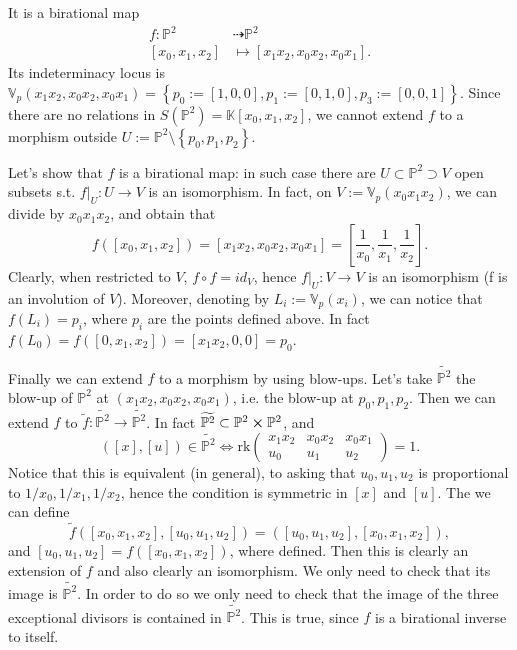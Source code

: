 \begin{ex}
	It is a birational map
	\begin{align}
		f: \mathbb{P}^{2} &\dashrightarrow \mathbb{P}^{2} \\
		\left[ x_0, x_1 , x_2 \right] &\mapsto [ x_1x_2, x_0x_2, x_0x_1]
	.\end{align} 
	Its indeterminacy locus is $\mathbb{V}_p\left( x_1x_2, x_0x_2, x_0x_1 \right) = \left\{ 
	p_0 := [1,0,0], p_1 := [0,1,0], p_3 := [0,0,1] \right\}$.
	Since there are no relations in $S(\mathbb{P}^{2}) = \mathbb{K}\left[x_0, x_1, x_2 \right]$,
	we cannot extend $f$ to a morphism outside $U:= \mathbb{P}^{2} \setminus \left\{ p_0, p_1, p_2 \right\}$.

	Let's show that $f$ is a birational map: in such case there are $U \subset \mathbb{P}^{2} \supset V$
	open subsets s.t. $\left.f\right|_{U}: U \to V$ is an isomorphism.
	In fact, on $V := \mathbb{V}_p\left( x_0x_1x_2 \right)$, we can divide by $x_0x_1x_2$, and obtain that
	\begin{equation}
		f([x_0, x_1, x_2]) = [x_1x_2, x_0x_2, x_0x_1] = 
		[ \frac{1}{x_0}, \frac{1}{x_1}, \frac{1}{x_2}]
	.\end{equation} 
	Clearly, when restricted to $V$, $f \circ f = id_V$, hence $\left.f\right|_{U}: V \to V$
	is an isomorphism (f is an involution of $V$).
	Moreover, denoting by $L_i := \mathbb{V}_p\left( x_i \right)$, we can notice that
	$f(L_i) = p_i$, where $p_i$ are the points defined above.
	In fact $f(L_0) = f([0,x_1,x_2]) = [x_1x_2, 0, 0] = p_0$.

	Finally we can extend $f$ to a morphism by using blow-ups.
	Let's take $\widetilde{\mathbb{P}^{2}}$ the blow-up of $\mathbb{P}^{2}$ at
	$(x_1x_2, x_0x_2, x_0x_1)$, i.e. the blow-up at $p_0, p_1, p_2$.
	Then we can extend $f$ to $\tilde{f}: \widetilde{\mathbb{P}^{2}} \to \widetilde{\mathbb{P}^{2}}$.
	In fact $\widetilde{\mathbb{P}^{2}} \subset \mathbb{P}^{2} \cross \mathbb{P}^{2}$, and
	\begin{equation}
		\left( [x], [u] \right) \in \widetilde{\mathbb{P}^{2}} \iff
		\mathrm{rk}
		\begin{pmatrix}
			x_1x_2 & x_0x_2 & x_0x_1\\
			u_0 & u_1 & u_2
		\end{pmatrix} = 1
	.\end{equation} 
	Notice that this is equivalent (in general), to asking that $u_0, u_1, u_2$ is proportional to $1/x_0, 1/x_1, 1/x_2$,
	hence the condition is symmetric in $[x]$ and $[u]$.
	The we can define
	\begin{equation}
		\tilde{f} \left( [x_0, x_1, x_2], [u_0, u_1, u_2] \right) =
		\left( [u_0, u_1, u_2], [x_0, x_1, x_2] \right)
	,\end{equation} 
	and $[u_0, u_1, u_2] = f([x_0, x_1, x_2])$, where defined.
	Then this is clearly an extension of $f$ and also clearly an isomorphism.
	We only need to check that its image is $\widetilde{\mathbb{P}^{2}}$.
	In order to do so we only need to check that the image of the three exceptional divisors
	is contained in $\widetilde{\mathbb{P}^{2}}$.
	This is true, since $f$ is a birational inverse to itself.


\end{ex}
